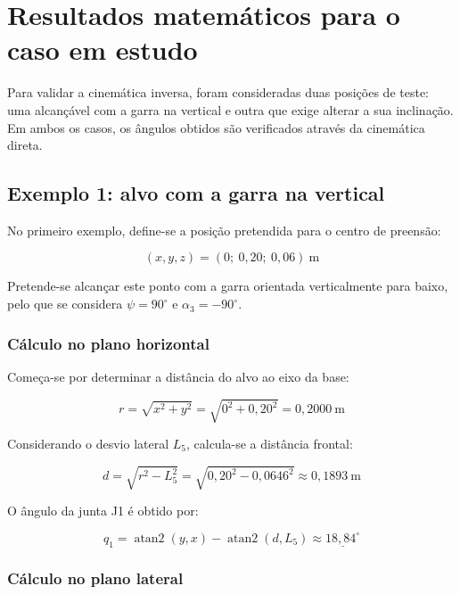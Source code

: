 \section{Resultados matemáticos para o caso em estudo}
\label{sec:ik_resultados}

Para validar a cinemática inversa, foram consideradas duas posições de teste: uma alcançável com a garra na vertical e outra que exige alterar a sua inclinação. Em ambos os casos, os ângulos obtidos são verificados através da cinemática direta.

\subsection{Exemplo 1: alvo com a garra na vertical}

No primeiro exemplo, define-se a posição pretendida para o centro de preensão:

\begin{equation}
    (x,y,z)=(0;\ 0{,}20;\ 0{,}06)\ \text{m}
\end{equation}

Pretende-se alcançar este ponto com a garra orientada verticalmente para baixo, pelo que se considera $\psi=90^\circ$ e $\alpha_3=-90^\circ$.

\subsubsection*{Cálculo no plano horizontal}

Começa-se por determinar a distância do alvo ao eixo da base:

\begin{equation}
    r=\sqrt{x^2+y^2}
    =\sqrt{0^2+0{,}20^2}
    =0{,}2000\ \text{m}
\end{equation}

Considerando o desvio lateral $L_5$, calcula-se a distância frontal:

\begin{equation}
    d=\sqrt{r^2-L_5^2}
    =\sqrt{0{,}20^2-0{,}0646^2}
    \approx0{,}1893\ \text{m}
    \label{eq:ex1_d}
\end{equation}

O ângulo da junta J1 é obtido por:

\begin{equation}
    q_1=\operatorname{atan2}(y,x)
    -\operatorname{atan2}(d,L_5)
    \approx\underline{18{,}84^\circ}
\end{equation}

\subsubsection*{Cálculo no plano lateral}

